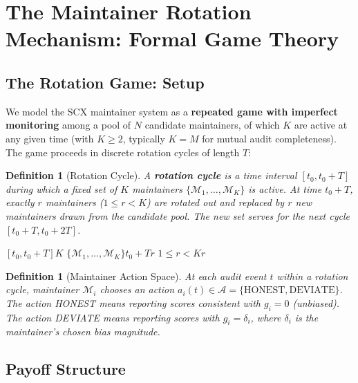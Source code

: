 \documentclass[12pt,a4paper]{article}
\newtheorem{definition}[theorem]{Definition}
\theoremstyle{remark}
\begin{document}
\newpage

\section{}
\section{The Maintainer Rotation Mechanism: Formal Game Theory}

\subsection{The Rotation Game: Setup}

We model the SCX maintainer system as a \textbf{repeated game with imperfect
monitoring} among a pool of $N$ candidate maintainers, of which $K$ are active
at any given time (with $K \geq 2$, typically $K = M$ for mutual audit
completeness). The game proceeds in discrete rotation cycles of length $T$:

\begin{definition}[Rotation Cycle]
A \textbf{rotation cycle} is a time interval $[t_0, t_0 + T]$ during which a
fixed set of $K$ maintainers $\{\mathcal{M}_1, \ldots, \mathcal{M}_K\}$ is
active. At time $t_0 + T$, exactly $r$ maintainers ($1 \leq r < K$) are rotated
out and replaced by $r$ new maintainers drawn from the candidate pool. The new
set serves for the next cycle $[t_0 + T, t_0 + 2T]$.
\end{definition}

\noindent\textbf{}
$[t_0, t_0 + T]$$K$
$\{\mathcal{M}_1, \ldots, \mathcal{M}_K\}$$t_0 + T$$r$
$1 \leq r < K$$r$

\begin{definition}[Maintainer Action Space]
At each audit event $t$ within a rotation cycle, maintainer $\mathcal{M}_i$
chooses an action $a_i(t) \in \mathcal{A} = \{\text{HONEST}, \text{DEVIATE}\}$.
The action HONEST means reporting scores consistent with $g_i = 0$ (unbiased).
The action DEVIATE means reporting scores with $g_i = \delta_i$, where
$\delta_i$ is the maintainer's chosen bias magnitude.
\end{definition}

\subsection{Payoff Structure}
\end{document}
